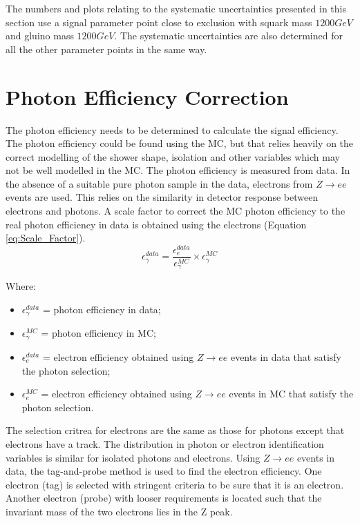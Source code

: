 The numbers and plots relating to the systematic uncertainties presented in this 
section use a signal parameter point close to exclusion with squark mass 
$1200\unit{GeV}$ and gluino mass $1200\unit{GeV}$. The systematic uncertainties
are also determined for all the other parameter points in the same way.

\section{Photon Efficiency Correction}
\label{sec:phoeff}

The photon efficiency needs to be determined to calculate the signal efficiency.
The photon efficiency could be found using the MC, but that relies heavily on
the correct modelling of the shower shape, isolation and other variables which
may not be well modelled in the MC. The photon efficiency is measured from data. 
In the absence of a suitable pure photon sample in the data, electrons from 
$Z\rightarrow ee$ events are used. This relies on the similarity in detector 
response between electrons and photons. A scale factor to correct the MC photon 
efficiency to the real photon efficiency in data is obtained using the electrons 
(Equation \ref{eq:Scale_Factor}). \\

\begin{equation}
\epsilon_{\gamma}^{data} = \frac{\epsilon_{e}^{data}}{\epsilon_{\gamma}^{MC}}
\times \epsilon_{\gamma}^{MC}
\label{eq:Scale_Factor}
\end{equation}  

Where:
\begin{itemize}
\item $\epsilon_{\gamma}^{data}$ = photon efficiency in data;
\item $\epsilon_{\gamma}^{MC}$ = photon efficiency in MC;
\item $\epsilon_{e}^{data}$ = electron efficiency obtained using $Z\rightarrow
ee$ events in data that satisfy the photon selection; 
\item $\epsilon_{e}^{MC}$ = electron efficiency obtained using $Z\rightarrow ee$
events in MC that satisfy the photon selection. 
\end{itemize}

The selection critrea for electrons are the same as those for photons except 
that electrons have a track. The distribution in photon or electron 
identification variables is similar for isolated photons and electrons. Using 
$Z\rightarrow ee$ events in data, the tag-and-probe method is used to find the 
electron efficiency. One electron (tag) is selected with stringent criteria to 
be sure that it is an electron. Another electron (probe) with looser 
requirements is located such that the invariant mass of the two electrons lies 
in the Z peak. \\

